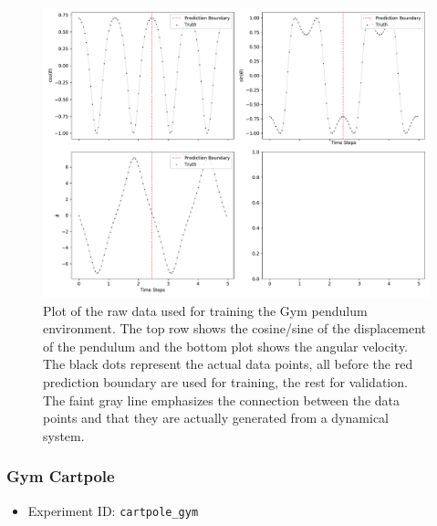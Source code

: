 			\begin{figure}
				\centering
				\includegraphics[width=\linewidth]{figures/experiments/environments/observations-pendulum-gym-N0.pdf}
				\caption[Raw data of the Gym pendulum environment]{Plot of the raw data used for training the Gym pendulum environment. The top row shows the cosine/sine of the displacement of the pendulum and the bottom plot shows the angular velocity. The black dots represent the actual data points, all before the red prediction boundary are used for training, the rest for validation. The faint gray line emphasizes the connection between the data points and that they are actually generated from a dynamical system.}
				\label{fig:envPendulumGym}
			\end{figure}

		\subsubsection{Gym Cartpole}
			\label{subsubsec:cartpole}

			\begin{itemize}
				\item Experiment ID: \texttt{cartpole\_gym}
			\end{itemize}

